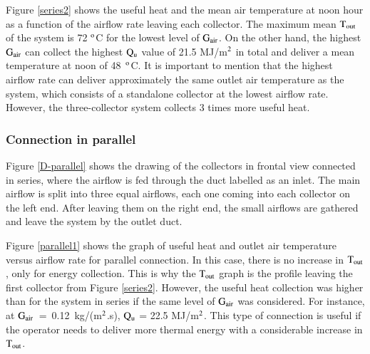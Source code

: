 Figure \ref{series2} shows the useful heat and the mean air temperature at noon hour as a function of the airflow rate leaving each collector. The maximum mean $\rm{T_{out}}$ of the system is 72 $^{\rm{o}}$C for the lowest level of $\rm{G_{air}}$. On the other hand, the highest $\rm{G_{air}}$ can collect the highest $\rm{Q_{u}}$ value of 21.5 MJ/m$^{\rm 2}$ in total and deliver a mean temperature at noon of 48~$^{\rm{o}}$C. It is important to mention that the highest airflow rate can deliver approximately the same outlet air temperature as the system, which consists of a standalone collector at the lowest airflow rate. However, the three-collector system collects 3 times more useful heat.


\subsubsection{Connection in parallel}

Figure \ref{D-parallel} shows the drawing of the collectors in frontal view connected in series, where the airflow is fed through the duct labelled as an inlet.  The main airflow is split into three equal airflows, each one coming into each collector on the left end. After leaving them on the right end, the small airflows are gathered and leave the system by the outlet duct.


Figure \ref{parallel1} shows the graph of useful heat and outlet air temperature versus airflow rate for parallel connection. In this case, there is no increase in $\rm{T_{out}}$, only for energy collection. This is why the $\rm{T_{out}}$ graph is the profile leaving the first collector from Figure \ref{series2}. However, the useful heat collection was higher than for the system in series if the same level of $\rm{G_{air}}$ was considered. For instance, at $\rm{G_{air}}$~=~0.12~kg/(m$^{\rm 2}$.s), $\rm{Q_{u}}$ = 22.5 MJ/m$^{\rm 2}$. This type of connection is useful if the operator needs to deliver more thermal energy with a considerable increase in $\rm{T_{out}}$.


